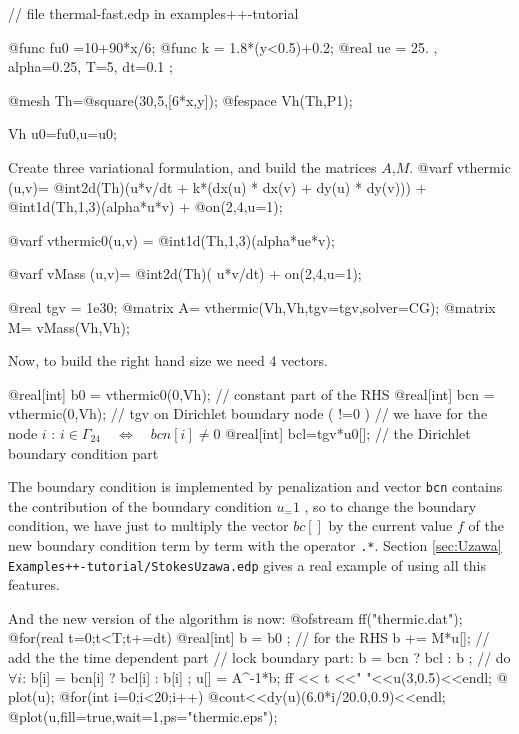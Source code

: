 \documentclass[a4paper,twoside,12pt]{book}
\def\refSec#1{Section \ref{sec:#1}}
\begin{document}
 \bFF
// file thermal-fast.edp  in examples++-tutorial

@func fu0 =10+90*x/6;
@func k = 1.8*(y<0.5)+0.2;
@real ue = 25. , alpha=0.25, T=5, dt=0.1 ;

@mesh Th=@square(30,5,[6*x,y]);
@fespace Vh(Th,P1);

Vh u0=fu0,u=u0;
\eFF

Create three variational formulation, and build the matrices $A$,$M$.\label{matrix-varf}
\bFF
@varf vthermic (u,v)= @int2d(Th)(u*v/dt + k*(dx(u) * dx(v) + dy(u) * dy(v)))
            +  @int1d(Th,1,3)(alpha*u*v) + @on(2,4,u=1);

@varf vthermic0(u,v) =   @int1d(Th,1,3)(alpha*ue*v);

@varf vMass (u,v)= @int2d(Th)( u*v/dt)  + on(2,4,u=1);

@real tgv = 1e30;
@matrix A= vthermic(Vh,Vh,tgv=tgv,solver=CG);
@matrix M= vMass(Vh,Vh);
\eFF

Now, to build the right hand size we need 4 vectors.

\bFF

@real[int]  b0  = vthermic0(0,Vh); // constant part of the RHS
@real[int]  bcn = vthermic(0,Vh); //  tgv on Dirichlet boundary  node  ( !=0 )
// we have for the node $i$ : $i\in \Gamma_{24}  \quad \Leftrightarrow \quad bcn[i] \ne 0 $
@real[int]  bcl=tgv*u0[]; //  the Dirichlet boundary condition part


\eFF

\begin{note} The boundary condition  is implemented
 by penalization and vector \texttt{bcn} contains
 the contribution of the boundary condition $u_=1$ ,
so to change the boundary condition,
we have just to multiply the vector $bc[]$ by the current value $f$
 of the new boundary condition term by term
with the operator \texttt{.*}.
\refSec{Uzawa} \texttt{Examples++-tutorial/StokesUzawa.edp}  gives
 a real example of using all this features.
\end{note}


And the new version of the algorithm is now:
\bFF
@ofstream ff("thermic.dat");
@for(real t=0;t<T;t+=dt){
    @real[int] b = b0 ; // for the  RHS
    b += M*u[]; //  add the the time dependent part
    // lock boundary part:
    b = bcn ? bcl  : b ; // do $\forall i$:  b[i] =  bcn[i] ? bcl[i] : b[i]  ;
    u[] = A^-1*b;
    ff << t <<" "<<u(3,0.5)<<endl;
   @ plot(u);
}
@for(int i=0;i<20;i++)
  @cout<<dy(u)(6.0*i/20.0,0.9)<<endl;
@plot(u,fill=true,wait=1,ps="thermic.eps");
\eFF
\end{document}
